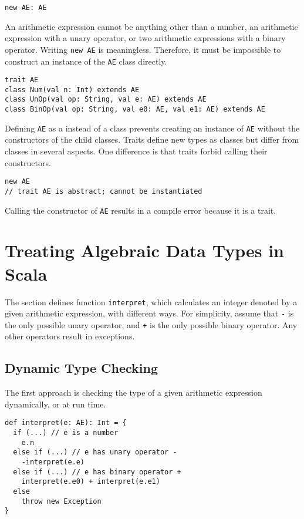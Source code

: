 \begin{verbatim}
new AE: AE
\end{verbatim}

An arithmetic expression cannot be anything other than a number, an arithmetic
expression with a unary operator, or two arithmetic expressions with a binary
operator. Writing \verb!new AE! is meaningless. Therefore, it must be impossible
to construct an instance of the \verb!AE! class directly.

\begin{verbatim}
trait AE
class Num(val n: Int) extends AE
class UnOp(val op: String, val e: AE) extends AE
class BinOp(val op: String, val e0: AE, val e1: AE) extends AE
\end{verbatim}

Defining \verb!AE! as a  instead of a class prevents creating an
instance of \verb!AE! without the constructors of the child classes. Traits
define new types as classes but differ from classes in several aspects. One
difference is that traits forbid calling their constructors.

\begin{verbatim}
new AE
// trait AE is abstract; cannot be instantiated
\end{verbatim}

Calling the constructor of \verb!AE! results in a compile error because it is a
trait.

\section{Treating Algebraic Data Types in Scala}

The section defines function \verb!interpret!, which calculates an integer
denoted by a given arithmetic expression, with different ways. For simplicity,
assume that \verb!-! is the only possible unary operator, and \verb!+! is the
only possible binary operator. Any other operators result in exceptions.

\subsection{Dynamic Type Checking}

The first approach is checking the type of a given arithmetic expression
dynamically, or at run time.

\begin{verbatim}
def interpret(e: AE): Int = {
  if (...) // e is a number
    e.n
  else if (...) // e has unary operator -
    -interpret(e.e)
  else if (...) // e has binary operator +
    interpret(e.e0) + interpret(e.e1)
  else
    throw new Exception
}
\end{verbatim}

